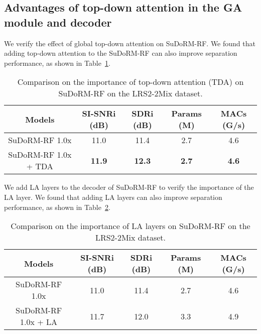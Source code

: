 \documentclass{article} \usepackage{iclr2023_conference,times}
\begin{document}
\subsection{Advantages of top-down attention in the GA module and decoder}
\label{sec:a-tda-ga-de}









We verify the effect of global top-down attention on SuDoRM-RF. We found that adding top-down attention to the SuDoRM-RF can also improve separation performance, as shown in Table~\ref{table:sudoatt}.

\begin{table}[ht]
\caption{Comparison on the importance of top-down attention (TDA) on SuDoRM-RF on the LRS2-2Mix dataset.}
\label{table:sudoatt}
\begin{center}
\begin{tabular}{ccccc}
\toprule
Models & SI-SNRi (dB) & SDRi (dB) & Params (M) & MACs (G/s) \\
\midrule
SuDoRM-RF 1.0x & 11.0 & 11.4 & 2.7 & 4.6 \\
SuDoRM-RF 1.0x + TDA & \textbf{11.9} & \textbf{12.3} & \textbf{2.7} & \textbf{4.6} \\
\bottomrule
\end{tabular}
\end{center}
\end{table}



We add LA layers to the decoder of SuDoRM-RF to verify the importance of the LA layer. We found that adding LA layers can also improve separation performance, as shown in Table~\ref{table:lft}.

\begin{table}[ht]
\caption{Comparison on the importance of LA layers on SuDoRM-RF on the LRS2-2Mix dataset.}
\label{table:lft}
\begin{center}
\begin{tabular}{ccccc}
\toprule
Models & SI-SNRi (dB) & SDRi (dB) & Params (M) & MACs (G/s) \\
\midrule
SuDoRM-RF 1.0x & 11.0 & 11.4 & 2.7 & 4.6 \\
SuDoRM-RF 1.0x + LA & 11.7 & 12.0 & 3.3 & 4.9 \\
\bottomrule
\end{tabular}
\end{center}
\end{table}
\end{document}
